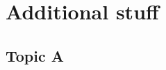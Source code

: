 \appendix
\section{Additional stuff}\label{appendix:additional_stuff}
\kant[5]

\subsection{Topic A}
\kant[10]